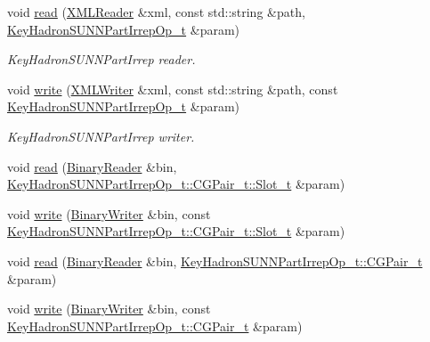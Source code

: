\begin{DoxyCompactItemize}
\item 
void \mbox{\hyperlink{namespaceHadron_a6ee3d9a9ffb4f6e626fa1a73b49c9ee0}{read}} (\mbox{\hyperlink{classADATXML_1_1XMLReader}{X\+M\+L\+Reader}} \&xml, const std\+::string \&path, \mbox{\hyperlink{structHadron_1_1KeyHadronSUNNPartIrrepOp__t}{Key\+Hadron\+S\+U\+N\+N\+Part\+Irrep\+Op\+\_\+t}} \&param)
\begin{DoxyCompactList}\small\item\em Key\+Hadron\+S\+U\+N\+N\+Part\+Irrep reader. \end{DoxyCompactList}\item 
void \mbox{\hyperlink{namespaceHadron_a04a5b512d84ea116e0714765e22cbc30}{write}} (\mbox{\hyperlink{classADATXML_1_1XMLWriter}{X\+M\+L\+Writer}} \&xml, const std\+::string \&path, const \mbox{\hyperlink{structHadron_1_1KeyHadronSUNNPartIrrepOp__t}{Key\+Hadron\+S\+U\+N\+N\+Part\+Irrep\+Op\+\_\+t}} \&param)
\begin{DoxyCompactList}\small\item\em Key\+Hadron\+S\+U\+N\+N\+Part\+Irrep writer. \end{DoxyCompactList}\item 
void \mbox{\hyperlink{namespaceHadron_a5927f6c6b145b1ae72a2bc9461e617ca}{read}} (\mbox{\hyperlink{classADATIO_1_1BinaryReader}{Binary\+Reader}} \&bin, \mbox{\hyperlink{structHadron_1_1KeyHadronSUNNPartIrrepOp__t_1_1CGPair__t_1_1Slot__t}{Key\+Hadron\+S\+U\+N\+N\+Part\+Irrep\+Op\+\_\+t\+::\+C\+G\+Pair\+\_\+t\+::\+Slot\+\_\+t}} \&param)
\item 
void \mbox{\hyperlink{namespaceHadron_ad5c8dc860360f98655b29f17b61f2a35}{write}} (\mbox{\hyperlink{classADATIO_1_1BinaryWriter}{Binary\+Writer}} \&bin, const \mbox{\hyperlink{structHadron_1_1KeyHadronSUNNPartIrrepOp__t_1_1CGPair__t_1_1Slot__t}{Key\+Hadron\+S\+U\+N\+N\+Part\+Irrep\+Op\+\_\+t\+::\+C\+G\+Pair\+\_\+t\+::\+Slot\+\_\+t}} \&param)
\item 
void \mbox{\hyperlink{namespaceHadron_ae56ab02908d10b1a8e5c2bad920dfe5a}{read}} (\mbox{\hyperlink{classADATIO_1_1BinaryReader}{Binary\+Reader}} \&bin, \mbox{\hyperlink{structHadron_1_1KeyHadronSUNNPartIrrepOp__t_1_1CGPair__t}{Key\+Hadron\+S\+U\+N\+N\+Part\+Irrep\+Op\+\_\+t\+::\+C\+G\+Pair\+\_\+t}} \&param)
\item 
void \mbox{\hyperlink{namespaceHadron_a53c6ec066bb836eb7474a8a18be8fea7}{write}} (\mbox{\hyperlink{classADATIO_1_1BinaryWriter}{Binary\+Writer}} \&bin, const \mbox{\hyperlink{structHadron_1_1KeyHadronSUNNPartIrrepOp__t_1_1CGPair__t}{Key\+Hadron\+S\+U\+N\+N\+Part\+Irrep\+Op\+\_\+t\+::\+C\+G\+Pair\+\_\+t}} \&param)

\end{DoxyCompactItemize}
